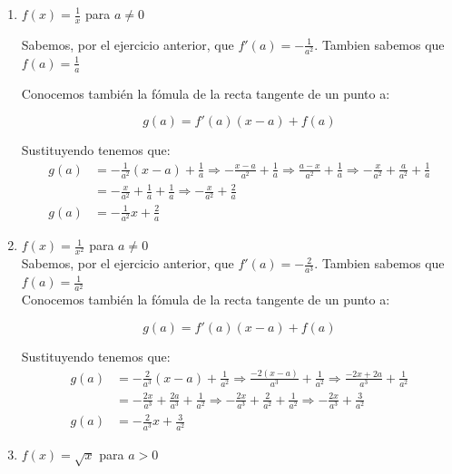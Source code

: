 \documentclass[12pt]{article}
\begin{document}
\begin{enumerate}[\hspace{9px} a)]
    \item \(f(x)=\displaystyle\frac{1}{x}\) para \(a \neq 0\)\medskip

        Sabemos, por el ejercicio anterior, que \(f'(a)=-\displaystyle\frac{1}{a^2}\). Tambien sabemos que \(f(a)=\displaystyle\frac{1}{a}\)\medskip

        Conocemos también la fómula de la recta tangente de un punto a:

        \[g(a)=f'(a)(x-a)+f(a)\]

        Sustituyendo tenemos que:
        \begin{align*}
            g(a)&=-\frac{1}{a^2}(x-a)+\frac{1}{a} \Rightarrow -\frac{x-a}{a^2}+\frac{1}{a} \Rightarrow \frac{a-x}{a^2}+\frac{1}{a} \Rightarrow -\frac{x}{a^2}+\frac{a}{a^2}+\frac{1}{a}\\
            &=-\frac{x}{a^2}+\frac{1}{a}+\frac{1}{a} \Rightarrow -\frac{x}{a^2}+\frac{2}{a}\\
            g(a)&=-\frac{1}{a^2}x+\frac{2}{a}
        \end{align*}

    \item \(f(x)=\displaystyle\frac{1}{x^2}\) para \(a \neq 0\)\\

        Sabemos, por el ejercicio anterior, que \(f'(a)=-\displaystyle\frac{2}{a^3}\). Tambien sabemos que \(f(a)=\displaystyle\frac{1}{a^2}\)\\

        Conocemos también la fómula de la recta tangente de un punto a:

        \[g(a)=f'(a)(x-a)+f(a)\]

        Sustituyendo tenemos que:
        \begin{align*}
            g(a)&=-\frac{2}{a^3}(x-a)+\frac{1}{a^2} \Rightarrow \frac{-2(x-a)}{a^3}+\frac{1}{a^2} \Rightarrow \frac{-2x+2a}{a^3}+\frac{1}{a^2}\\
            &=-\frac{2x}{a^3}+\frac{2a}{a^3}+\frac{1}{a^2} \Rightarrow -\frac{2x}{a^3}+\frac{2}{a^2}+\frac{1}{a^2} \Rightarrow -\frac{2x}{a^3}+\frac{3}{a^2}\\
            g(a)&=-\frac{2}{a^3}x+\frac{3}{a^2}
        \end{align*}

    \item \(f(x)=\sqrt{x}\) para \(a > 0\)\\


\end{enumerate}
\end{document}
